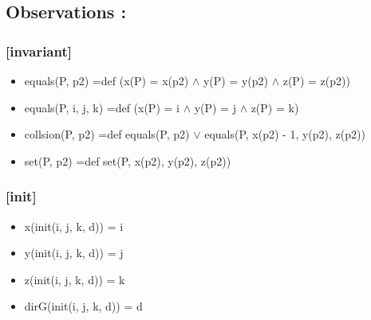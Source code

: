 \documentclass[11pt]{article}
\begin{document}
\subsection{Observations :}
\label{sec-1.6}

\subsubsection{[invariant]}
\label{sec-1.6.1}

\begin{itemize}

\item equals(P, p2) =def (x(P) = x(p2) $\wedge$ y(P) = y(p2) $\wedge$ z(P) = z(p2))\\
\label{sec-1.6.1.1}


\item equals(P, i, j, k) =def (x(P) = i $\wedge$ y(P) = j $\wedge$ z(P) = k)\\
\label{sec-1.6.1.2}


\item collsion(P, p2) =def equals(P, p2) $\vee$ equals(P, x(p2) - 1, y(p2), z(p2))\\
\label{sec-1.6.1.3}


\item set(P, p2) =def set(P, x(p2), y(p2), z(p2))\\
\label{sec-1.6.1.4}


\end{itemize} %
\subsubsection{[init]}
\label{sec-1.6.2}

\begin{itemize}

\item x(init(i, j, k, d)) = i\\
\label{sec-1.6.2.1}


\item y(init(i, j, k, d)) = j\\
\label{sec-1.6.2.2}


\item z(init(i, j, k, d)) = k\\
\label{sec-1.6.2.3}


\item dirG(init(i, j, k, d)) = d\\
\label{sec-1.6.2.4}


\end{itemize} %
\end{document}
